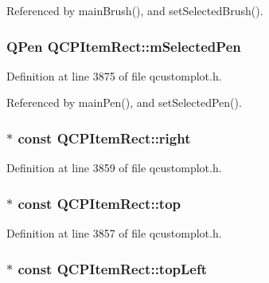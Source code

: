 Referenced by main\+Brush(), and set\+Selected\+Brush().

\hypertarget{class_q_c_p_item_rect_a73cc0bee61de3c67221ec8c7a76a29ed}{}
\subsubsection[{m\+Selected\+Pen}]{\setlength{\rightskip}{0pt plus 5cm}Q\+Pen Q\+C\+P\+Item\+Rect\+::m\+Selected\+Pen\hspace{0.3cm}{\ttfamily [protected]}}\label{class_q_c_p_item_rect_a73cc0bee61de3c67221ec8c7a76a29ed}


Definition at line 3875 of file qcustomplot.\+h.



Referenced by main\+Pen(), and set\+Selected\+Pen().

\hypertarget{class_q_c_p_item_rect_a7979c1915f61ad2609a9cc179c2e445e}{}
\subsubsection[{right}]{$\ast$ const Q\+C\+P\+Item\+Rect\+::right}\label{class_q_c_p_item_rect_a7979c1915f61ad2609a9cc179c2e445e}


Definition at line 3859 of file qcustomplot.\+h.

\hypertarget{class_q_c_p_item_rect_a96e50db552fb297d6fb62614676217bc}{}
\subsubsection[{top}]{$\ast$ const Q\+C\+P\+Item\+Rect\+::top}\label{class_q_c_p_item_rect_a96e50db552fb297d6fb62614676217bc}


Definition at line 3857 of file qcustomplot.\+h.

\hypertarget{class_q_c_p_item_rect_aa70feeef173489b03c3fbe906a5023c4}{}
\subsubsection[{top\+Left}]{$\ast$ const Q\+C\+P\+Item\+Rect\+::top\+Left}\label{class_q_c_p_item_rect_aa70feeef173489b03c3fbe906a5023c4}


